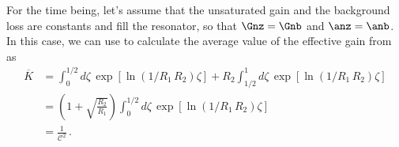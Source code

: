 For the time being, let's assume that the unsaturated gain and the background loss are constants and fill the resonator, so that $\Gnz = \Gnb$ and $\anz = \anb$. In this case, we can use  to calculate the average value of the effective gain from  as
\begin{equation}
    \begin{split}
        \overline{K} &= \int_{0}^{1/2} d \zeta\, \exp\left[\ln\left(1/R_1\, R_2\right) \zeta\right] + R_2 \int_{1/2}^{1} d \zeta\, \exp\left[\ln\left(1/R_1\, R_2\right) \zeta\right] \\
        &= \left(1 + \sqrt{\frac{R_2}{R_1}}\right) \int_{0}^{1/2} d \zeta\, \exp\left[\ln\left(1/R_1\, R_2\right) \zeta\right] \\
        &= \frac{1}{\mathcal{C}^2}\, .
    \end{split}
\end{equation}
